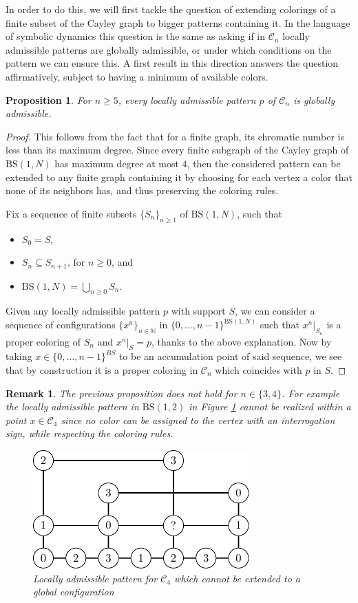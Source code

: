 \documentclass[cupthm,crop,info]{CUP-JNL-ETS}%
\theoremstyle{cupplain}
\newtheorem{proposition}[theorem]{Proposition}
\theoremstyle{cupdefinition}
\theoremstyle{cupremark}
\newtheorem{remark}[theorem]{Remark}
\theoremstyle{cupproof}
\newtheorem{proof}{Proof}
\numberwithin{equation}{section}
\newcommand{\BS}[1][N]{\mathrm{BS}(1,#1)}
\begin{document}
In order to do this, we will first tackle the question of extending colorings of a finite subset of the Cayley graph to bigger patterns containing it. In the language of symbolic dynamics this question is the same as asking if in $\mathcal{C}_n$ locally admissible patterns are globally admissible, or under which conditions on the pattern we can ensure this. A first result in this direction answers the question affirmatively, subject to having a minimum of available colors.
\begin{proposition} \label{prop:loc_adm_5_colors}
	For $n\ge 5$, every locally admissible pattern $p$ of $\mathcal{C}_n$ is globally admissible.
\end{proposition}
\begin{proof}
	This follows from the fact that for a finite graph, its chromatic number is less than its maximum degree. Since every finite subgraph of the Cayley graph of $\BS$ has maximum degree at most $4$, then the considered pattern can be extended to any finite graph containing it by choosing for each vertex a color that none of its neighbors has, and thus preserving the coloring rules. 

	Fix a sequence of finite subsets $\{S_n\}_{n\ge 1}$ of $\BS$, such that
	\begin{itemize}
	\item $S_0=S$,
	\item $S_n\subseteq S_{n+1}$, for $n\ge 0$, and
	\item $\BS=\bigcup_{n\ge 0}S_n$.
	\end{itemize}

	Given any locally admissible pattern $p$ with support $S$, we can consider a sequence of configurations $\{x^{n}\}_{n\in \mathbb{N}}$ in $\{0,\ldots,n-1\}^{\BS}$ such that $x^{n}|_{S_n}$ is a proper coloring of $S_n$ and $x^{n}|_{S}=p$, thanks to the above explanation. Now by taking $x\in \{0,\ldots,n-1\}^{BS}$ to be an accumulation point of said sequence, we see that by construction it is a proper coloring in $\mathcal{C}_n$ which coincides with $p$ in $S$.
\end{proof}
\begin{remark} The previous proposition does not hold for $n\in \{3,4\}$. For example the locally admissible pattern in $\BS[2]$ in Figure \ref{fig:no_extend_gap} cannot be realized within a point $x \in \mathcal{C}_4$ since no color can be assigned to the vertex with an interrogation sign, while respecting the coloring rules.
	\begin{figure}
		\centering
		\includegraphics{non_globallyadmissible.pdf}
		\caption{Locally admissible pattern for $\mathcal{C}_4$ which cannot be extended to a global configuration}
		\label{fig:no_extend_gap}
	\end{figure}	
\end{remark}
\end{document}
